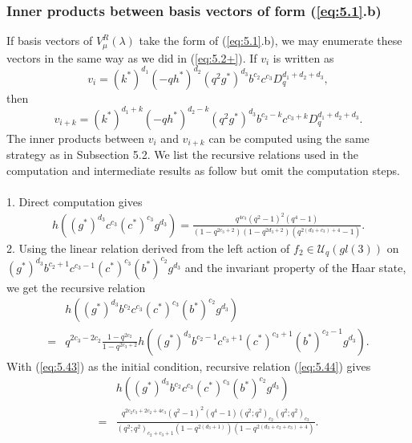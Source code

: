 \documentclass[table,a4paper,reqno]{amsart}
\numberwithin{equation}{section}
\theoremstyle{definition}
\begin{document}
\subsubsection{Inner products between basis vectors of form (\ref{eq:5.1}.b)}
If basis vectors of $V^R_\mu(\lambda)$ take the form of (\ref{eq:5.1}.b), we may enumerate these vectors in the same way as we did in (\ref{eq:5.2+}). If $v_i$ is written as
\begin{equation}\label{eq:5.44+}
    v_i=(k^*)^{d_1}(-qh^*)^{d_2}(q^2g^*)^{d_3}b^{c_2}c^{c_3}D_q^{d_1+d_2+d_3},
\end{equation}
then
\begin{equation}\label{eq:5.45+}
    v_{i+k}=(k^*)^{d_1+k}(-qh^*)^{d_2-k}(q^2g^*)^{d_3}b^{c_2-k}c^{c_3+k}D_q^{d_1+d_2+d_3}.
\end{equation}
The inner products between $v_i$ and $v_{i+k}$ can be computed using the same strategy as in Subsection 5.2. We list the recursive relations used in the computation and intermediate results as follow but omit the computation steps. \\
\\
1. Direct computation gives
\begin{equation}\label{eq:5.43}
    \begin{split}
        h((g^*)^{d_3}c^{c_3}(c^*)^{c_3}g^{d_3})=\frac{q^{4c_3}(q^2-1)^2(q^4-1)}{(1-q^{2c_3+2})(1-q^{2d_3+2})(q^{2(d_3+c_3)+4}-1)}.
    \end{split}
\end{equation}
2. Using the linear relation derived from the left action of $f_2\in\mathcal{U}_q(gl(3))$ on $(g^*)^{d_3}b^{c_2+1}c^{c_3-1}(c^*)^{c_3}(b^*)^{c_2}g^{d_3}$ and the invariant property of the Haar state, we get the recursive relation
\begin{equation}\label{eq:5.44}
    \begin{split}
        &h((g^*)^{d_3}b^{c_2}c^{c_3}(c^*)^{c_3}(b^*)^{c_2}g^{d_3})\\
        =&q^{2c_3-2c_2}\frac{1-q^{2c_2}}{1-q^{2c_3+2}}h((g^*)^{d_3}b^{c_2-1}c^{c_3+1}(c^*)^{c_3+1}(b^*)^{c_2-1}g^{d_3}).
    \end{split}
\end{equation}
With (\ref{eq:5.43}) as the initial condition, recursive relation (\ref{eq:5.44}) gives
\begin{equation}\label{eq:5.45}
    \begin{split}
        &h((g^*)^{d_3}b^{c_2}c^{c_3}(c^*)^{c_3}(b^*)^{c_2}g^{d_3})\\
        =&\frac{q^{2c_2c_3+2c_2+4c_3}(q^2-1)^2(q^4-1)(q^2;q^2)_{c_2}(q^2;q^2)_{c_3}}{(q^2;q^2)_{c_2+c_3+1}(1-q^{2(d_3+1)})(1-q^{2(d_3+c_2+c_3)+4})}.
    \end{split}
\end{equation}
\end{document}
